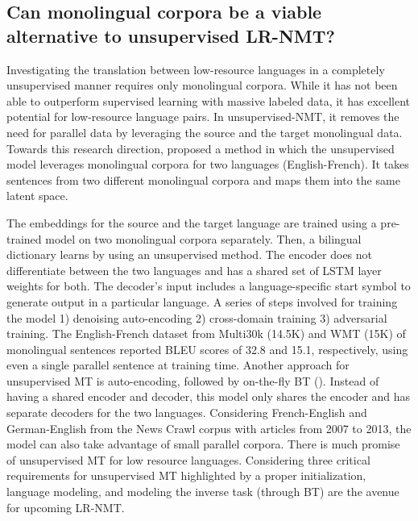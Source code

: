 \documentclass[manuscript,screen]{acmart}
\begin{document}
\subsection{Can monolingual corpora be a viable alternative to unsupervised LR-NMT?}
Investigating the translation between low-resource languages in a completely unsupervised manner requires only monolingual corpora. While it has not been able to outperform supervised learning with massive labeled data, it has excellent potential for low-resource language pairs. In unsupervised-NMT, it removes the need for parallel data by leveraging the source and the target monolingual data.
Towards this research direction, \citet{lample2017unsupervised} proposed a method in which the unsupervised model leverages monolingual corpora for two languages (English-French). It takes sentences from two different monolingual corpora and maps them into the same latent space.

The embeddings for the source and the target language are trained using a pre-trained model on two monolingual corpora separately. Then, a bilingual dictionary learns by using an unsupervised method. The encoder does not differentiate between the two languages and has a shared set of LSTM layer weights for both. The decoder's input includes a language-specific start symbol to generate output in a particular language. A series of steps involved for training the model 1) denoising auto-encoding 2) cross-domain training 3) adversarial training. The English-French dataset from Multi30k (14.5K) and WMT (15K) of monolingual sentences reported BLEU scores of 32.8 and 15.1, respectively, using even a single parallel sentence at training time.
Another approach for unsupervised MT is auto-encoding, followed by on-the-fly BT (\citet{artetxe2018unsupervised}). Instead of having a shared encoder and decoder, this model only shares the encoder and has separate decoders for the two languages. Considering French-English and German-English from the News Crawl corpus with articles from 2007 to 2013, the model can also take advantage of small parallel corpora.
There is much promise of unsupervised MT for low resource languages. Considering three critical requirements for unsupervised MT highlighted by \citet{lample2018phrase} a proper initialization, language modeling, and modeling the inverse task (through BT) are the avenue for upcoming LR-NMT.
\end{document}
